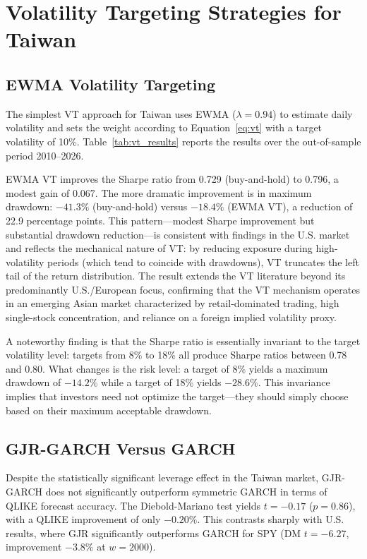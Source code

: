 \section{Volatility Targeting Strategies for Taiwan}
\label{sec:vt}

\subsection{EWMA Volatility Targeting}

The simplest VT approach for Taiwan uses EWMA ($\lambda = 0.94$) to estimate daily volatility and sets the weight according to Equation~\eqref{eq:vt} with a target volatility of 10\%. Table~\ref{tab:vt_results} reports the results over the out-of-sample period 2010--2026.

EWMA VT improves the Sharpe ratio from 0.729 (buy-and-hold) to 0.796, a modest gain of 0.067. The more dramatic improvement is in maximum drawdown: $-41.3\%$ (buy-and-hold) versus $-18.4\%$ (EWMA VT), a reduction of 22.9 percentage points. This pattern---modest Sharpe improvement but substantial drawdown reduction---is consistent with findings in the U.S. market \citep{moreira2017,harvey2018} and reflects the mechanical nature of VT: by reducing exposure during high-volatility periods (which tend to coincide with drawdowns), VT truncates the left tail of the return distribution. The result extends the VT literature beyond its predominantly U.S./European focus, confirming that the VT mechanism operates in an emerging Asian market characterized by retail-dominated trading, high single-stock concentration, and reliance on a foreign implied volatility proxy.

A noteworthy finding is that the Sharpe ratio is essentially invariant to the target volatility level: targets from 8\% to 18\% all produce Sharpe ratios between 0.78 and 0.80. What changes is the risk level: a target of 8\% yields a maximum drawdown of $-14.2\%$ while a target of 18\% yields $-28.6\%$. This invariance implies that investors need not optimize the target---they should simply choose based on their maximum acceptable drawdown.

\subsection{GJR-GARCH Versus GARCH}

Despite the statistically significant leverage effect in the Taiwan market, GJR-GARCH does not significantly outperform symmetric GARCH in terms of QLIKE forecast accuracy. The Diebold-Mariano test yields $t = -0.17$ ($p = 0.86$), with a QLIKE improvement of only $-0.20\%$. This contrasts sharply with U.S. results, where GJR significantly outperforms GARCH for SPY (DM $t = -6.27$, improvement $-3.8\%$ at $w = 2000$).

